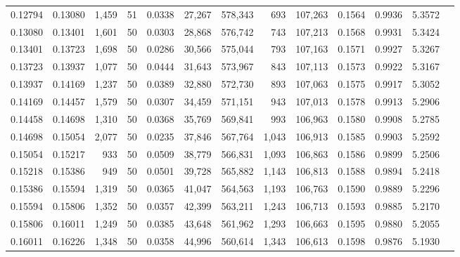 \begin{tabular}{rrrrrrrrrrrrr}
0.12794 & 0.13080 & 1,459 &  51 &                                     0.0338 &  27,267 & 578,343 &     693 & 107,263 & 0.1564 & 0.9936 & 5.3572 \\
0.13080 & 0.13401 & 1,601 &  50 &                                     0.0303 &  28,868 & 576,742 &     743 & 107,213 & 0.1568 & 0.9931 & 5.3424 \\
0.13401 & 0.13723 & 1,698 &  50 &                                     0.0286 &  30,566 & 575,044 &     793 & 107,163 & 0.1571 & 0.9927 & 5.3267 \\
0.13723 & 0.13937 & 1,077 &  50 &                                     0.0444 &  31,643 & 573,967 &     843 & 107,113 & 0.1573 & 0.9922 & 5.3167 \\
0.13937 & 0.14169 & 1,237 &  50 &                                     0.0389 &  32,880 & 572,730 &     893 & 107,063 & 0.1575 & 0.9917 & 5.3052 \\
0.14169 & 0.14457 & 1,579 &  50 &                                     0.0307 &  34,459 & 571,151 &     943 & 107,013 & 0.1578 & 0.9913 & 5.2906 \\
0.14458 & 0.14698 & 1,310 &  50 &                                     0.0368 &  35,769 & 569,841 &     993 & 106,963 & 0.1580 & 0.9908 & 5.2785 \\
0.14698 & 0.15054 & 2,077 &  50 &                                     0.0235 &  37,846 & 567,764 &   1,043 & 106,913 & 0.1585 & 0.9903 & 5.2592 \\
0.15054 & 0.15217 &   933 &  50 &                                     0.0509 &  38,779 & 566,831 &   1,093 & 106,863 & 0.1586 & 0.9899 & 5.2506 \\
0.15218 & 0.15386 &   949 &  50 &                                     0.0501 &  39,728 & 565,882 &   1,143 & 106,813 & 0.1588 & 0.9894 & 5.2418 \\
0.15386 & 0.15594 & 1,319 &  50 &                                     0.0365 &  41,047 & 564,563 &   1,193 & 106,763 & 0.1590 & 0.9889 & 5.2296 \\
0.15594 & 0.15806 & 1,352 &  50 &                                     0.0357 &  42,399 & 563,211 &   1,243 & 106,713 & 0.1593 & 0.9885 & 5.2170 \\
0.15806 & 0.16011 & 1,249 &  50 &                                     0.0385 &  43,648 & 561,962 &   1,293 & 106,663 & 0.1595 & 0.9880 & 5.2055 \\
0.16011 & 0.16226 & 1,348 &  50 &                                     0.0358 &  44,996 & 560,614 &   1,343 & 106,613 & 0.1598 & 0.9876 & 5.1930 \\

\end{tabular}
